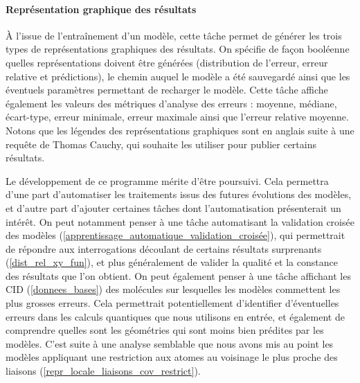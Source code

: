 \paragraph{Représentation graphique des résultats}  À l'issue de l'entraînement d'un modèle, cette tâche permet de générer les trois types de représentations graphiques des résultats. On spécifie de façon booléenne quelles représentations doivent être générées (distribution de l'erreur, erreur relative et prédictions), le chemin auquel le modèle a été sauvegardé ainsi que les éventuels paramètres permettant de recharger le modèle. Cette tâche affiche également les valeurs des métriques d'analyse des erreurs : moyenne, médiane, écart-type, erreur minimale, erreur maximale ainsi que l'erreur relative moyenne.\\
Notons que les légendes des représentations graphiques sont en anglais suite à une requête de Thomas Cauchy, qui souhaite les utiliser pour publier certains résultats.\\

\par Le développement de ce programme mérite d'être poursuivi. Cela permettra d'une part d'automatiser les traitements issus des futures évolutions des modèles, et d'autre part d'ajouter certaines tâches dont l'automatisation présenterait un intérêt. On peut notamment penser à une tâche automatisant la validation croisée des modèles (\ref{apprentissage_automatique_validation_croisée}), qui permettrait de répondre aux interrogations découlant de certains résultats surprenants (\ref{dist_rel_xy_fun}), et plus généralement de valider la qualité et la constance des résultats que l'on obtient. On peut également penser à une tâche affichant les CID (\ref{donnees_bases}) des molécules sur lesquelles les modèles commettent les plus grosses erreurs. Cela permettrait potentiellement d'identifier d'éventuelles erreurs dans les calculs quantiques que nous utilisons en entrée, et également de comprendre quelles sont les géométries qui sont moins bien prédites par les modèles. C'est suite à une analyse semblable que nous avons mis au point les modèles appliquant une restriction aux atomes au voisinage le plus proche des liaisons (\ref{repr_locale_liaisons_cov_restrict}).
